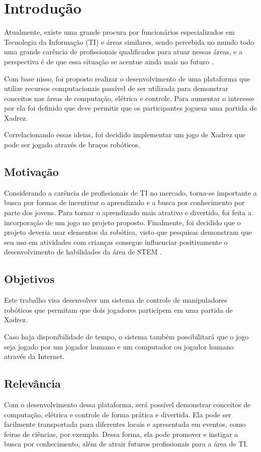 \chapter[Introdução]{Introdução}
\label{cap:introducao}

Atualmente, existe uma grande procura por funcionários especializados em Tecnologia da Informação (TI) e áreas similares,
sendo percebida no mundo todo uma grande carência de profissionais qualificados para atuar nessas áreas, e a perspectiva é de que essa situação se acentue ainda mais no futuro \cite{shortage_of_workers}.

Com base nisso, foi proposto realizar o desenvolvimento de uma plataforma que utilize recursos computacionais passível de ser utilizada para demonstrar conceitos nas áreas de computação, elétrica e controle.
Para aumentar o interesse por ela foi definido que deve permitir que os participantes joguem uma partida de Xadrez.

Correlacionando essas ideias, foi decidido implementar um jogo de Xadrez que pode ser jogado através de braços robóticos.

\section[Motivação]{Motivação}

Considerando a carência de profissionais de TI no mercado, torna-se importante a busca por formas de incentivar o aprendizado e a busca por conhecimento por parte dos jovens.
Para tornar o aprendizado mais atrativo e divertido, foi feita a incorporação de um jogo no projeto proposto.
Finalmente, foi decidido que o projeto deveria usar elementos da robótica, visto que pesquisas demonstram que seu uso em atividades com crianças consegue influenciar positivamente o desenvolvimento de habilidades da área de STEM \cite{technology_for_stem}.

\section[Objetivos]{Objetivos}

Este trabalho visa desenvolver um sistema de controle de manipuladores robóticos que permitam que dois jogadores participem em uma partida de Xadrez.

Caso haja disponibilidade de tempo, o sistema também possibilitará que o jogo seja jogado por um jogador humano e um computador ou jogador humano através da Internet.

\section[Relevância]{Relevância}

Com o desenvolvimento dessa plataforma, será possível demonstrar conceitos de computação, elétrica e controle de forma prática e divertida.
Ela pode ser facilmente transportada para diferentes locais e apresentada em eventos, como feiras de ciências, por exemplo.
Dessa forma, ela pode promover e instigar a busca por conhecimento, além de atrair futuros profissionais para a área de TI.